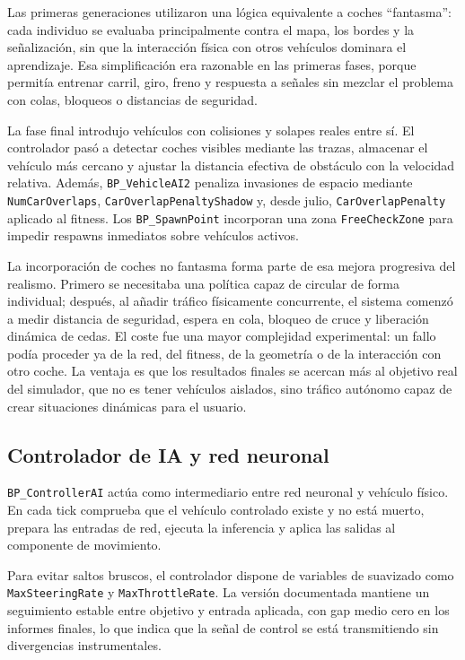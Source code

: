 Las primeras generaciones utilizaron una lógica equivalente a coches ``fantasma'': cada individuo se evaluaba principalmente contra el mapa, los bordes y la señalización, sin que la interacción física con otros vehículos dominara el aprendizaje. Esa simplificación era razonable en las primeras fases, porque permitía entrenar carril, giro, freno y respuesta a señales sin mezclar el problema con colas, bloqueos o distancias de seguridad.

La fase final introdujo vehículos con colisiones y solapes reales entre sí. El controlador pasó a detectar coches visibles mediante las trazas, almacenar el vehículo más cercano y ajustar la distancia efectiva de obstáculo con la velocidad relativa. Además, \texttt{BP\_VehicleAI2} penaliza invasiones de espacio mediante \texttt{NumCarOverlaps}, \texttt{CarOverlapPenaltyShadow} y, desde julio, \texttt{CarOverlapPenalty} aplicado al fitness. Los \texttt{BP\_SpawnPoint} incorporan una zona \texttt{FreeCheckZone} para impedir respawns inmediatos sobre vehículos activos.

La incorporación de coches no fantasma forma parte de esa mejora progresiva del realismo. Primero se necesitaba una política capaz de circular de forma individual; después, al añadir tráfico físicamente concurrente, el sistema comenzó a medir distancia de seguridad, espera en cola, bloqueo de cruce y liberación dinámica de cedas. El coste fue una mayor complejidad experimental: un fallo podía proceder ya de la red, del fitness, de la geometría o de la interacción con otro coche. La ventaja es que los resultados finales se acercan más al objetivo real del simulador, que no es tener vehículos aislados, sino tráfico autónomo capaz de crear situaciones dinámicas para el usuario.

\subsection{Controlador de IA y red neuronal}

\texttt{BP\_ControllerAI} actúa como intermediario entre red neuronal y vehículo físico. En cada tick comprueba que el vehículo controlado existe y no está muerto, prepara las entradas de red, ejecuta la inferencia y aplica las salidas al componente de movimiento.

Para evitar saltos bruscos, el controlador dispone de variables de suavizado como \texttt{MaxSteeringRate} y \texttt{MaxThrottleRate}. La versión documentada mantiene un seguimiento estable entre objetivo y entrada aplicada, con gap medio cero en los informes finales, lo que indica que la señal de control se está transmitiendo sin divergencias instrumentales.

